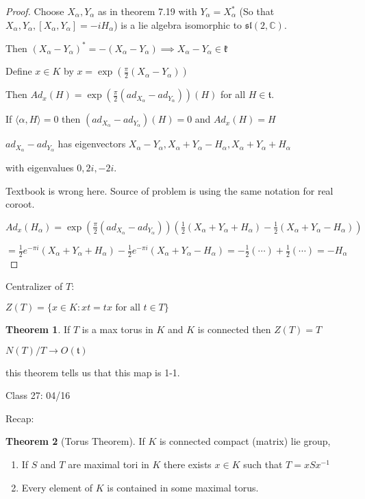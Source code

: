 \documentclass{article}
\theoremstyle{definition}
\newtheorem{theorem}{Theorem}
\begin{document}
\begin{proof}
    Choose \(X_\alpha , Y_\alpha\) as in theorem 7.19 with \(Y_\alpha = X_\alpha ^{\ast}\) (So that \(X_{\alpha}, Y_\alpha, [X_\alpha, Y_\alpha]=-i H_\alpha \)) is a lie algebra isomorphic to \(\mathfrak{sl}(2,\mathbb{C})\).
    
    Then \((X_\alpha - Y_\alpha)^{\ast} =-(X_\alpha - Y_\alpha )\implies X_\alpha - Y_\alpha \in \mathfrak{k} \)
    
    Define \(x\in K\) by \(x = \exp (\frac{\pi}{2}(X_\alpha - Y_\alpha))\)
    
    Then \(Ad_x(H)=\exp(\frac{\pi}{2}(ad_{X_\alpha}-ad_{Y_\alpha}))(H)\) for all \(H\in \mathfrak{t}\).
    
    If \(\langle \alpha , H \rangle = 0 \) then \((ad_{X_\alpha}-ad_{Y_\alpha})(H)=0\) and \(Ad_x(H)=H\) 
    
    \(ad_{X_\alpha}-ad_{Y_\alpha}\) has eigenvectors \(X_\alpha - Y_\alpha, X_\alpha + Y_\alpha - H_\alpha , X_\alpha + Y_\alpha + H_\alpha\)
    
    with eigenvalues \(0, 2i, -2i\).

    Textbook is wrong here. Source of problem is using the same notation for real coroot.

    \(Ad_x (H_\alpha)= \exp(\frac{\pi}{2}(ad_{X_\alpha}-ad_{Y_\alpha}))(\frac{1}{2}(X_\alpha + Y_\alpha + H_\alpha)-\frac{1}{2}(X_\alpha + Y_\alpha -H_\alpha))\)
    
    \(= \frac{1}{2}e^{-\pi i}(X_\alpha + Y_\alpha + H_\alpha)- \frac{1}{2}e^{-\pi i}(X_\alpha + Y_\alpha - H_\alpha )= -\frac{1}{2}(\cdots)+\frac{1}{2}(\cdots)=-H_\alpha\) 
\end{proof}

Centralizer of \(T\):

\(Z(T)=\{ x\in K : xt = tx  \text{ for all } t\in T \} \) 

\begin{theorem}
    If \(T\) is a max torus in \(K\) and \(K\) is connected then \(Z(T)=T\) 
\end{theorem}

\(N(T) / T \to O(\mathfrak{t})\) 

this theorem tells us that this map is 1-1.

\hrulefill

Class 27: 04/16

Recap:

\begin{theorem}
    [Torus Theorem] If \(K\) is connected compact (matrix) lie group,

    \begin{enumerate}
        \item If \(S\) and \(T\) are maximal tori in \(K\) there exists \(x\in K\) such that \(T = x S x ^{-1}\) 
        \item Every element of \(K\) is contained in some maximal torus.
    \end{enumerate}
\end{theorem}
\end{document}
